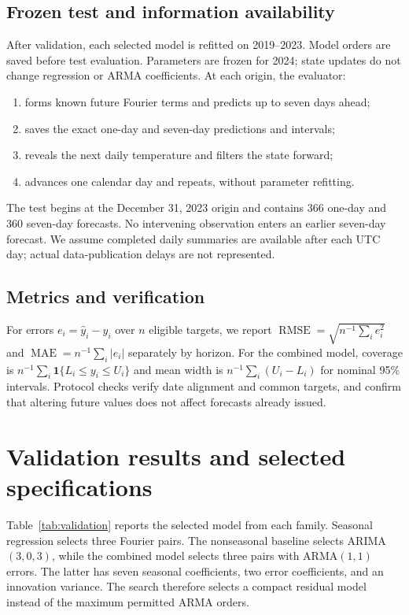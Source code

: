 \documentclass{article}
\begin{document}
\subsection{Frozen test and information availability}
After validation, each selected model is refitted on 2019--2023. Model orders
are saved before test evaluation. Parameters are frozen for 2024; state updates
do not change regression or ARMA coefficients. At each origin, the evaluator:
\begin{enumerate}
\item forms known future Fourier terms and predicts up to seven days ahead;
\item saves the exact one-day and seven-day predictions and intervals;
\item reveals the next daily temperature and filters the state forward;
\item advances one calendar day and repeats, without parameter refitting.
\end{enumerate}
The test begins at the December 31, 2023 origin and contains 366 one-day and
360 seven-day forecasts. No intervening observation enters an earlier seven-day
forecast. We assume completed daily summaries are available after each UTC day;
actual data-publication delays are not represented.

\subsection{Metrics and verification}
For errors $e_i=\widehat y_i-y_i$ over $n$ eligible targets, we report
$\operatorname{RMSE}=\sqrt{n^{-1}\sum_i e_i^2}$ and
$\operatorname{MAE}=n^{-1}\sum_i|e_i|$ separately by horizon.
For the combined model, coverage is $n^{-1}\sum_i\mathbf{1}\{L_i\leq y_i\leq U_i\}$
and mean width is $n^{-1}\sum_i(U_i-L_i)$ for nominal 95\% intervals.
Protocol checks verify date alignment and common targets, and confirm that
altering future values does not affect forecasts already issued.

\newpage
\section{Validation results and selected specifications}
Table~\ref{tab:validation} reports the selected model from each family. Seasonal
regression selects three Fourier pairs. The nonseasonal baseline selects
ARIMA$(3,0,3)$, while the combined model selects three pairs with
ARMA$(1,1)$ errors. The latter has seven seasonal coefficients, two error
coefficients, and an innovation variance. The search therefore selects a compact
residual model instead of the maximum permitted ARMA orders.
\end{document}
